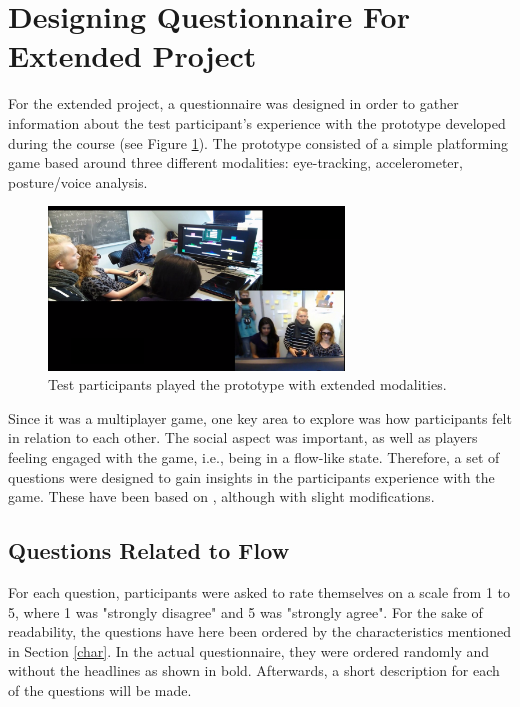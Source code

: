 \section{Designing Questionnaire For Extended Project}
For the extended project, a questionnaire was designed in order to gather information about the test participant's experience with the prototype developed during the course (see Figure \ref{fig:prototype}). The prototype consisted of a simple platforming game based around three different modalities: eye-tracking, accelerometer, posture/voice analysis.

\begin{figure}[htbp]
\centering
\includegraphics[width=0.70\textwidth]{Pictures/extended_modality}
\caption{Test participants played the prototype with extended modalities.}
\label{fig:prototype}
\end{figure}

Since it was a multiplayer game, one key area to explore was how participants felt in relation to each other. The social aspect was important, as well as players feeling engaged with the game, i.e., being in a flow-like state. Therefore, a set of questions were designed to gain insights in the participants experience with the game. These have been based on \cite{imiOne}, although with slight modifications.

\subsection{Questions Related to Flow}
For each question, participants were asked to rate themselves on a scale from 1 to 5, where 1 was "strongly disagree" and 5 was "strongly agree". For the sake of readability, the questions have here been ordered by the characteristics mentioned in Section \ref{char}. In the actual questionnaire, they were ordered randomly and without the headlines as shown in bold. Afterwards, a short description for each of the questions will be made.

